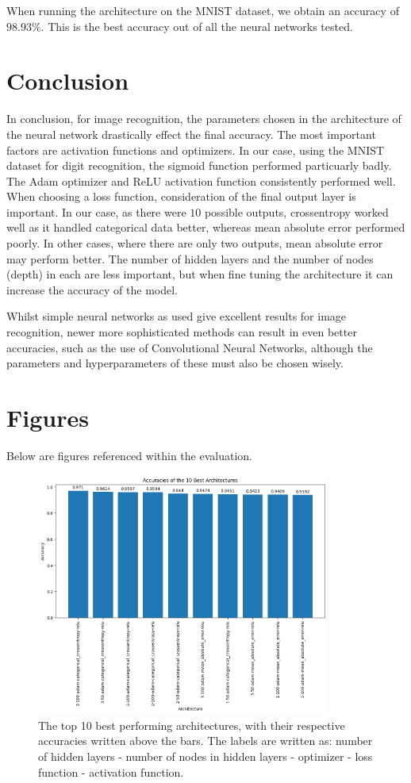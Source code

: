 \documentclass[a4paper,11pt]{article}
\theoremstyle{plain} %
\theoremstyle{definition} %
\theoremstyle{remark} %
\begin{document}
When running the architecture on the MNIST dataset, we obtain an accuracy of $98.93\%$. This is the best accuracy out of all the neural networks tested.

\section{Conclusion}

In conclusion, for image recognition, the parameters chosen in the architecture of the neural network drastically effect the final accuracy. The most important factors are activation functions and optimizers. In our case, using the MNIST dataset for digit recognition, the sigmoid function performed particuarly badly. The Adam optimizer and ReLU activation function consistently performed well. When choosing a loss function, consideration of the final output layer is important. In our case, as there were $10$ possible outputs, crossentropy worked well as it handled categorical data better, whereas mean absolute error performed poorly. In other cases, where there are only two outputs, mean absolute error may perform better. The number of hidden layers and the number of nodes (depth) in each are less important, but when fine tuning the architecture it can increase the accuracy of the model.


Whilst simple neural networks as used give excellent results for image recognition, newer more sophisticated methods can result in even better accuracies, such as the use of Convolutional Neural Networks, although the parameters and hyperparameters of these must also be chosen wisely.

\section{Figures}
Below are figures referenced within the evaluation.

\begin{figure}[h]
	\centering 
	\includegraphics[width=0.86\textwidth, angle=0]{best.png}	
	\caption{The top 10 best performing architectures, with their respective accuracies written above the bars. The labels are written as: number of hidden layers - number of nodes in hidden layers - optimizer - loss function - activation function.} 
	\label{best}%
\end{figure}
\end{document}
